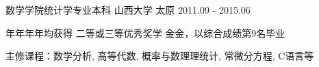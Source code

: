 

\begin{cventries}

  \cventry
    {数学学院统计学专业本科} %
    {山西大学} %
    {太原} %
    {2011.09 - 2015.06} %
    {
      \begin{cvitems} %
        \item {年年年年均获得 二等或三等优秀奖学 金金，以综合成绩第9名毕业}
        \item  {主修课程：数学分析, 高等代数, 概率与数理理统计, 常微分方程, C语言等}
      \end{cvitems}
    }

\end{cventries}
